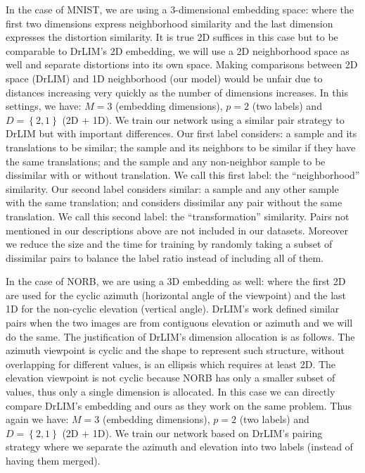\documentclass[a4paper,12pt]{report}
\begin{document}
In the case of MNIST, we are using a 3-dimensional embedding space: where the first two dimensions express neighborhood similarity and the last dimension expresses the distortion similarity.
It is true 2D suffices in this case but to be comparable to DrLIM's 2D embedding, we will use a 2D neighborhood space as well and separate distortions into its own space.
Making comparisons between 2D space (DrLIM) and 1D neighborhood (our model) would be unfair due to distances increasing very quickly as the number of dimensions increases.
In this settings, we have: $M=3$ (embedding dimensions), $p = 2$ (two labels) and $D = \left\{ 2, 1 \right\}$ (2D + 1D).
We train our network using a similar pair strategy to DrLIM but with important differences.
Our first label considers: a sample and its translations to be similar; the sample and its neighbors to be similar if they have the same translations; and the sample and any non-neighbor sample to be dissimilar with or without translation.
We call this first label: the ``neighborhood'' similarity.
Our second label considers similar: a sample and any other sample with the same translation; and considers dissimilar any pair without the same translation.
We call this second label: the ``transformation'' similarity.
Pairs not mentioned in our descriptions above are not included in our datasets.
Moreover we reduce the size and the time for training by randomly taking a subset of dissimilar pairs to balance the label ratio instead of including all of them.

In the case of NORB, we are using a 3D embedding as well: where the first 2D are used for the cyclic azimuth (horizontal angle of the viewpoint) and the last 1D for the non-cyclic elevation (vertical angle).
DrLIM's work defined similar pairs when the two images are from contiguous elevation or azimuth and we will do the same.
The justification of DrLIM's dimension allocation is as follows.
The azimuth viewpoint is cyclic and the shape to represent such structure, without overlapping for different values, is an ellipsis which requires at least 2D.
The elevation viewpoint is not cyclic because NORB has only a smaller subset of values, thus only a single dimension is allocated.
In this case we can directly compare DrLIM's embedding and ours as they work on the same problem.
Thus again we have: $M=3$ (embedding dimensions), $p = 2$ (two labels) and $D = \left\{ 2, 1 \right\}$ (2D + 1D).
We train our network based on DrLIM's pairing strategy where we separate the azimuth and elevation into two labels (instead of having them merged).
\end{document}
